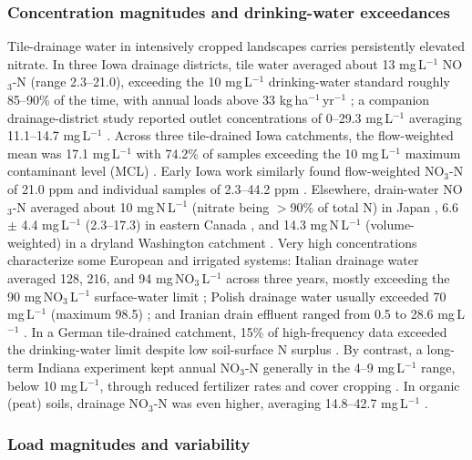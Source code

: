\documentclass[11pt]{article}
\begin{document}
\subsubsection{Concentration magnitudes and drinking-water exceedances}

Tile-drainage water in intensively cropped landscapes carries persistently elevated nitrate. In three Iowa drainage districts, tile water averaged about 13 mg\,L$^{-1}$ NO$_3$-N (range 2.3--21.0), exceeding the 10 mg\,L$^{-1}$ drinking-water standard roughly 85--90\% of the time, with annual loads above 33 kg\,ha$^{-1}$\,yr$^{-1}$ \parencite{Schilling2012b}; a companion drainage-district study reported outlet concentrations of 0--29.3 mg\,L$^{-1}$ averaging 11.1--14.7 mg\,L$^{-1}$ \parencite{Schilling2013}. Across three tile-drained Iowa catchments, the flow-weighted mean was 17.1 mg\,L$^{-1}$ with 74.2\% of samples exceeding the 10 mg\,L$^{-1}$ maximum contaminant level (MCL) \parencite{Ikenberry2014}. Early Iowa work similarly found flow-weighted NO$_3$-N of 21.0 ppm and individual samples of 2.3--44.2 ppm \parencite{BAKER1975}. Elsewhere, drain-water NO$_3$-N averaged about 10 mg\,N\,L$^{-1}$ (nitrate being $>$90\% of total N) in Japan \parencite{Hayashi1999}, 6.6 $\pm$ 4.4 mg\,L$^{-1}$ (2.3--17.3) in eastern Canada \parencite{Smith2011}, and 14.3 mg\,N\,L$^{-1}$ (volume-weighted) in a dryland Washington catchment \parencite{Kelley2017}. Very high concentrations characterize some European and irrigated systems: Italian drainage water averaged 128, 216, and 94 mg\,NO$_3$\,L$^{-1}$ across three years, mostly exceeding the 90 mg\,NO$_3$\,L$^{-1}$ surface-water limit \parencite{ROSSI1991}; Polish drainage water usually exceeded 70 mg\,L$^{-1}$ (maximum 98.5) \parencite{Dragon2016}; and Iranian drain effluent ranged from 0.5 to 28.6 mg\,L$^{-1}$ \parencite{DarziNaftchali2017}. In a German tile-drained catchment, 15\% of high-frequency data exceeded the drinking-water limit despite low soil-surface N surplus \parencite{Bauwe2020}. By contrast, a long-term Indiana experiment kept annual NO$_3$-N generally in the 4--9 mg\,L$^{-1}$ range, below 10 mg\,L$^{-1}$, through reduced fertilizer rates and cover cropping \parencite{Kladivko2021,Kladivko2004}. In organic (peat) soils, drainage NO$_3$-N was even higher, averaging 14.8--42.7 mg\,L$^{-1}$ \parencite{MILLER1979}.

\subsubsection{Load magnitudes and variability}
\end{document}
